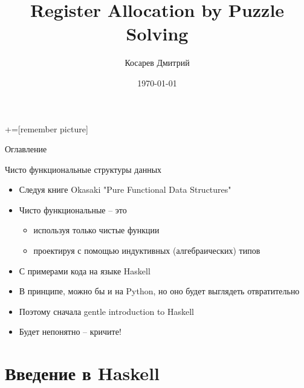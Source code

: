 \documentclass[aspectratio=169
  , xcolor={svgnames}
  , hyperref={ colorlinks,citecolor=DeepPink4
             , linkcolor=DarkRed,urlcolor=DarkBlue}
  , russian
  ]{beamer}
\title[]{Register Allocation by Puzzle Solving}
\author{Косарев Дмитрий }
\institute{матмех СПбГУ}
\date{\today}
\theoremstyle{exerciseStyle1}
\begin{document}
\maketitle

+=[remember picture] 

\everymath{\displaystyle}

\begin{frame}{Оглавление}
  \tableofcontents
\end{frame}

\begin{frame}[fragile]{Чисто функциональные структуры данных}
\begin{itemize}
  \item Следуя книге Okasaki "Pure Functional Data Structures"
  \item Чисто функциональные -- это 
    \begin{itemize}
      \item используя только чистые функции
      \item проектируя с помощью индуктивных (алгебраических) типов
    \end{itemize}
  \item С примерами кода на языке Haskell
  \item В принципе, можно бы и на Python, но оно будет выглядеть отвратительно
  \item Поэтому сначала gentle introduction to Haskell \textcopyright\vspace{.5cm}
  
  \item Будет непонятно -- кричите!
\end{itemize}
\end{frame}

{
\begin{frame}
\end{frame}
}

\section{Введение в Haskell}
\end{document}
